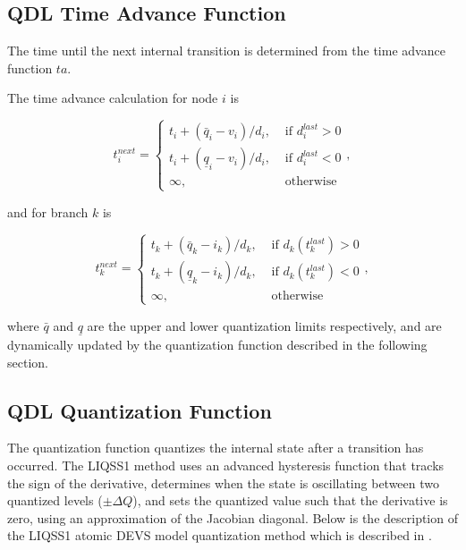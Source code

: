 \subsection{QDL Time Advance Function} 

The time until the next internal transition is determined from the time advance function $ta$. 

\noindent The time advance calculation for node $i$ is

\begin{equation} \label{eq:ta_node}
    t_i^{next} = 
    \begin{cases}
        t_i + ( \bar{q}_i - v_i ) \slash {d_i}, & \text{ if } d_i^{last} > 0 \\
        t_i + ( \underline{q}_i - v_i ) \slash {d_i}, & \text{ if } d_i^{last} < 0 \\
        \infty, &\text{ otherwise}
    \end{cases},
\end{equation}

\noindent and for branch $k$ is

\begin{equation} \label{eq:ta_branch}
    t_k^{next} = 
    \begin{cases}
        t_k + ( \bar{q}_k - i_k ) \slash {d_k}, & \text{ if } d_k(t_k^{last}) > 0 \\
        t_k + ( \underline{q}_k - i_k ) \slash {d_k}, & \text{ if } d_k(t_k^{last}) < 0 \\
        \infty, &\text{ otherwise}
    \end{cases},
\end{equation}

\noindent where $\bar{q}$ and $\underline{q}$ are the upper and lower quantization limits respectively, and are dynamically updated by the quantization function described in the following section. 

\subsection{QDL Quantization Function} 

The quantization function quantizes the internal state after a transition has occurred. The LIQSS1 method uses an advanced hysteresis function that tracks the sign of the derivative, determines when the state is oscillating between two quantized levels ($\pm \Delta Q$), and sets the quantized value such that the derivative is zero, using an approximation of the Jacobian diagonal. Below is the description of the LIQSS1 atomic DEVS model quantization method which is described in \cite{migoni2009}.

